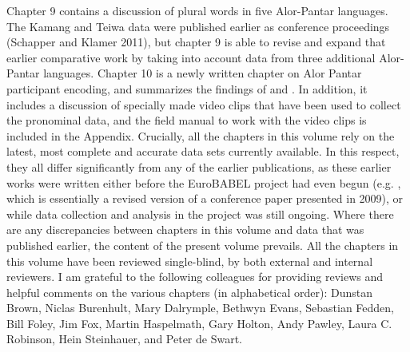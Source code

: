 \documentclass[output=paper]{LSP/langsci}
\begin{document}
	Chapter 9 contains a discussion of plural words in five Alor-Pantar languages. The Kamang and Teiwa data were published earlier as conference proceedings (Schapper and Klamer 2011), but chapter 9 is able to revise and expand that earlier comparative work by taking into account data from three additional Alor-Pantar languages.
	Chapter 10 is a newly written chapter on Alor Pantar participant encoding, and summarizes the findings of \citet{FeddenEtAl2013} and \citet{FeddenEtAl2014}. In addition, it includes a discussion of specially made video clips that have been used to collect the pronominal data, and the field manual to work with the video clips is included in the Appendix.
	Crucially, all the chapters in this volume rely on the latest, most complete and accurate data sets currently available. In this respect, they all differ significantly from any of the earlier publications, as these earlier works were written either before the EuroBABEL project had even begun (e.g. \citet{HoltonEtAl2012}, which is essentially a revised version of a conference paper presented in 2009), or while data collection and analysis in the project was still ongoing. Where there are any discrepancies between chapters in this volume and data that was published earlier, the content of the present volume prevails.
	All the chapters in this volume have been reviewed single-blind, by both external and internal reviewers. I am grateful to the following colleagues for providing reviews and helpful comments on the various chapters (in alphabetical order): Dunstan Brown, Niclas Burenhult, Mary Dalrymple, Bethwyn Evans, Sebastian Fedden, Bill Foley, Jim Fox, Martin Haspelmath, Gary Holton, Andy Pawley, Laura C. Robinson, Hein Steinhauer, and Peter de Swart.
\end{document}
